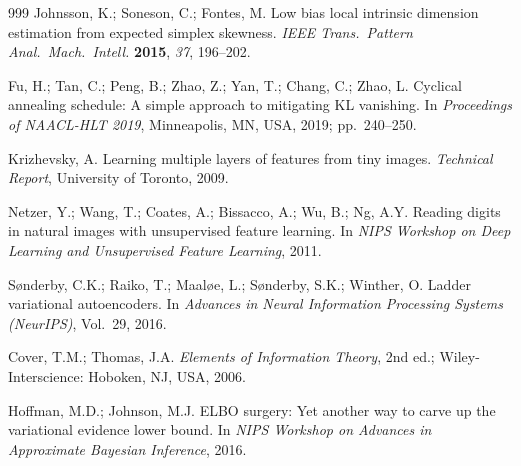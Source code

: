 \documentclass[make,article,submit,pdftex,moreauthors]{Definitions/mdpi}
\begin{document}
\begin{thebibliography}{999}
Johnsson, K.; Soneson, C.; Fontes, M.
Low bias local intrinsic dimension estimation from expected simplex
skewness.
\textit{IEEE Trans.\ Pattern Anal.\ Mach.\ Intell.} \textbf{2015},
\textit{37}, 196--202.

Fu, H.; Tan, C.; Peng, B.; Zhao, Z.; Yan, T.; Chang, C.; Zhao, L.
Cyclical annealing schedule: A simple approach to mitigating {KL} vanishing.
In \textit{Proceedings of NAACL-HLT 2019}, Minneapolis, MN, USA, 2019;
pp.~240--250.

Krizhevsky, A.
Learning multiple layers of features from tiny images.
\textit{Technical Report}, University of Toronto, 2009.

Netzer, Y.; Wang, T.; Coates, A.; Bissacco, A.; Wu, B.; Ng, A.Y.
Reading digits in natural images with unsupervised feature learning.
In \textit{NIPS Workshop on Deep Learning and Unsupervised Feature Learning},
2011.

S{\o}nderby, C.K.; Raiko, T.; Maal{\o}e, L.; S{\o}nderby, S.K.; Winther, O.
Ladder variational autoencoders.
In \textit{Advances in Neural Information Processing Systems (NeurIPS)},
Vol.~29, 2016.

Cover, T.M.; Thomas, J.A.
\textit{Elements of Information Theory}, 2nd ed.;
Wiley-Interscience: Hoboken, NJ, USA, 2006.

Hoffman, M.D.; Johnson, M.J.
{ELBO} surgery: Yet another way to carve up the variational evidence lower
bound.
In \textit{NIPS Workshop on Advances in Approximate Bayesian Inference},
2016.

\end{thebibliography}
\end{document}
